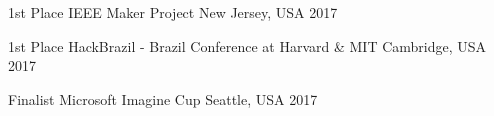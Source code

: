 



\begin{cvhonors}

  \cvhonor
    {1st Place} %
    {IEEE Maker Project} %
    {New Jersey, USA} %
    {2017} %

  \cvhonor
    {1st Place} %
    {HackBrazil - Brazil Conference at Harvard \& MIT} %
    {Cambridge, USA} %
    {2017} %

  \cvhonor
    {Finalist} %
    {Microsoft Imagine Cup} %
    {Seattle, USA} %
    {2017} %
    
\end{cvhonors}




